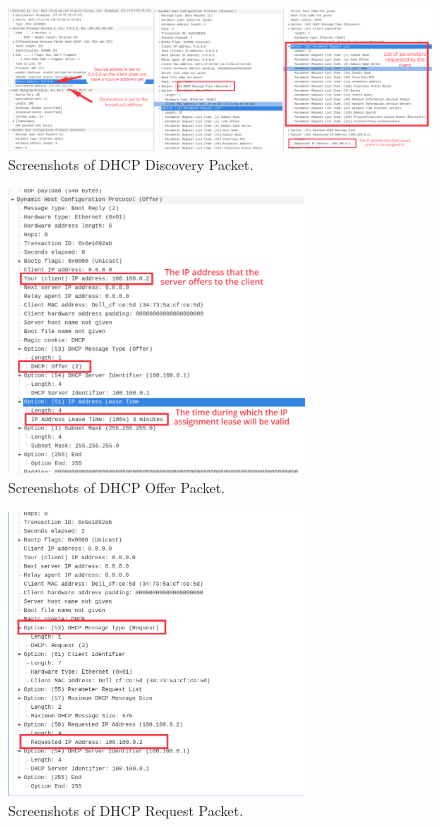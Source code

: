 \begin{figure}[htp]
\begin{center}
\includegraphics[width=1.1\textwidth]{DHCP-Discovery.png}
\end{center}
\caption{Screenshots of DHCP Discovery Packet.}
\label{dhcp-discovery}
\end{figure}

\begin{figure}[htp]
\begin{center}
\includegraphics[width=0.7\textwidth]{DHCP-Offer.png}
\end{center}
\caption{Screenshots of DHCP Offer Packet.}
\label{dhcp-offer}
\end{figure}

\begin{figure}[htp]
\begin{center}
\includegraphics[width=0.7\textwidth]{DHCP-Request.png}
\end{center}
\caption{Screenshots of DHCP Request Packet.}
\label{dhcp-request}
\end{figure}

